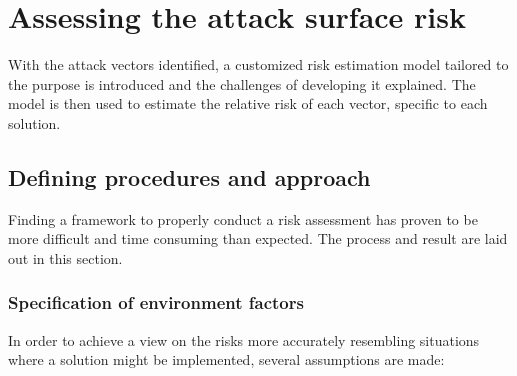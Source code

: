\chapter{Assessing the attack surface risk} \label{riskAssessTotal}
\setcounter{footnote}{0}
\vspace{-0.25cm}
With the attack vectors identified, a customized risk estimation model tailored to the purpose is introduced and the challenges of developing it explained. The model is then used to estimate the relative risk of each vector, specific to each solution.
\vspace{-0.25cm}
\section{Defining procedures and approach}
\vspace{-0.25cm}
Finding a framework to properly conduct a risk assessment has proven to be more difficult and time consuming than expected. The process and result are laid out in this section.
\vspace{-0.25cm}
\subsection{Specification of environment factors} \label{envDefine}
\vspace{-0.25cm}
In order to achieve a view on the risks more accurately resembling situations where a solution might be implemented, several assumptions are made:

